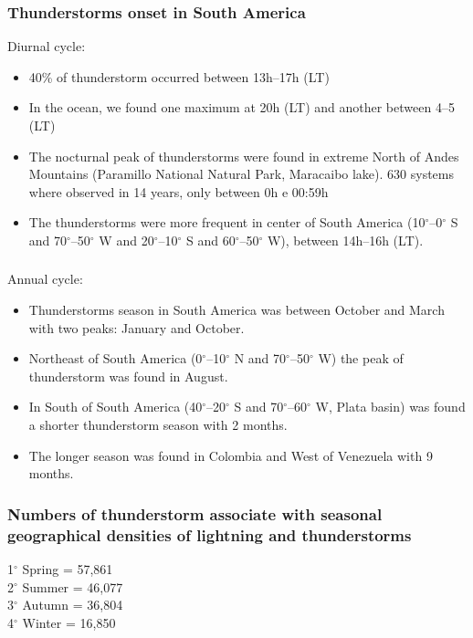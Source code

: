\documentclass[smaller]{beamer}
\begin{document}
\begin{frame}
\frametitle{Thunderstorms onset in South America}
\Large{Diurnal cycle:}
\begin{itemize}
\item 40\% of thunderstorm occurred between 13h--17h (LT)
\item In the ocean, we found one maximum at 20h (LT) and another between  4--5 (LT)
\item The nocturnal peak of thunderstorms were found in extreme North of Andes Mountains (Paramillo National Natural Park, Maracaibo lake). 630 systems where observed in 14 years, only between 0h e 00:59h
\item The thunderstorms were more frequent in center of South America (10$^{\circ}$--0$^{\circ}$ S and 70$^{\circ}$--50$^{\circ}$ W  and 20$^{\circ}$--10$^{\circ}$ S and 60$^{\circ}$--50$^{\circ}$ W), between 14h--16h (LT).
\end{itemize}

\end{frame}



\begin{frame}
\frametitle{}
\Large{Annual cycle:}
\begin{itemize}
\item Thunderstorms season in South America was between October and March with two peaks: January and October.
\item Northeast of South America (0$^{\circ}$--10$^{\circ}$ N and 70$^{\circ}$--50$^{\circ}$ W) the peak of thunderstorm was found in August.
\item In South of South America (40$^{\circ}$--20$^{\circ}$ S and 70$^{\circ}$--60$^{\circ}$ W, Plata basin) was found a shorter thunderstorm season with 2 months.  
\item The longer season was found in Colombia and West of Venezuela with 9 months.
\end{itemize}

\end{frame}

\begin{frame}
\frametitle{Numbers of thunderstorm associate with seasonal geographical densities of lightning and thunderstorms}
\Large
1$^{\circ}$ Spring = 57,861\\ 
2$^{\circ}$ Summer = 46,077\\
3$^{\circ}$ Autumn = 36,804\\
4$^{\circ}$ Winter = 16,850\\

\end{frame}
\end{document}
